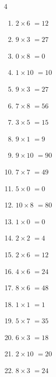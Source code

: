 \begin{multicols}{4}
\begin{enumerate}
  \itemsep=5pt
  \item $2\times 6$
        $=12$

  \item $9\times 3$
        $=27$

  \item $0\times 8$
        $=0$

  \item $1\times 10$
        $=10$

  \item $9\times 3$
        $=27$

  \item $7\times 8$
        $=56$

  \item $3\times 5$
        $=15$

  \item $9\times 1$
        $=9$

  \item $9\times 10$
        $=90$

  \item $7\times 7$
        $=49$

  \item $5\times 0$
        $=0$

  \item $10\times 8$
        $=80$

  \item $1\times 0$
        $=0$

  \item $2\times 2$
        $=4$

  \item $2\times 6$
        $=12$

  \item $4\times 6$
        $=24$

  \item $8\times 6$
        $=48$

  \item $1\times 1$
        $=1$

  \item $5\times 7$
        $=35$

  \item $6\times 3$
        $=18$

  \item $2\times 10$
        $=20$

  \item $8\times 3$
        $=24$


\end{enumerate}
\end{multicols}
